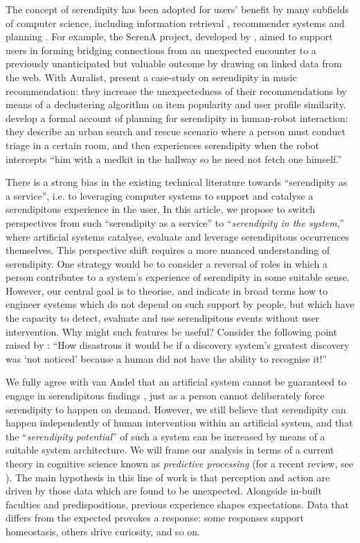 The concept of serendipity has been adopted for users' benefit by many subfields of computer science, including information retrieval \cite{Toms2000, Andre:2009:XSP:1518701.1519009}, recommender systems \cite{kotkov2016survey} and planning \cite{muscettola1997board, chakraborti2015planning}. For example, the {\sf SerenA} project, developed by \citet{maxwell2012designing}, aimed to support users in forming bridging connections from an unexpected encounter to a previously unanticipated but valuable outcome by drawing on linked data from the web. With {\sf Auralist}, \citet{Zhang2011} present a case-study on serendipity in music recommendation: they increase the unexpectedness of their recommendations by means of a declustering algorithm on item popularity and user profile similarity. \citet{chakraborti2015planning} develop a formal account of planning for serendipity in human-robot interaction: they describe an urban search and rescue scenario where a person must conduct triage in a certain room, and then experiences serendipity when the robot intercepts ``him with a medkit in the hallway so he need not fetch one himself.''

There is a strong bias in the existing technical literature towards ``serendipity as a service'', i.e. to leveraging computer systems to support and catalyse a serendipitous experience in the user. In this article, we propose to switch perspectives from such ``serendipity as a service'' to ``\emph{serendipity in the system},'' where artificial systems catalyse, evaluate and leverage serendipitous occurrences themselves. This perspective shift requires a more nuanced understanding of serendipity.  One strategy would be to consider a reversal of roles in which a person contributes to a system's experience of serendipity in some suitable sense.  However, our central goal is to theorise, and indicate in broad terms how to engineer systems which do not depend on such support by people, but which have the capacity to detect, evaluate and use serendipitous events without user intervention.  Why might such features be useful?  Consider the following point raised by \citet{delamaza1994generate}: ``How disastrous it would be if a discovery system's greatest discovery was `not noticed' because a human did not have the ability to recognise it!''

We fully agree with van Andel that an artificial system cannot be guaranteed to engage in serendipitous findings \cite{van1994anatomy}, just as a person cannot deliberately force serendipity to happen on demand.  However, we still believe that serendipity can happen independently of human intervention within an artificial system, and that the ``\emph{serendipity potential}'' of such a system can be increased by means of a suitable system architecture. 
We will frame our analysis in terms of a current theory in cognitive science known as \emph{predictive processing} (for a recent review, see \cite{newen2018oxford}).  The main hypothesis in this line of work is that perception and action are driven by those data which are found to be unexpected.  Alongside in-built faculties and predispositions, previous experience shapes expectations.  Data that differs from the expected provokes a response: some responses support homeostasis, others drive curiosity, and so on.


